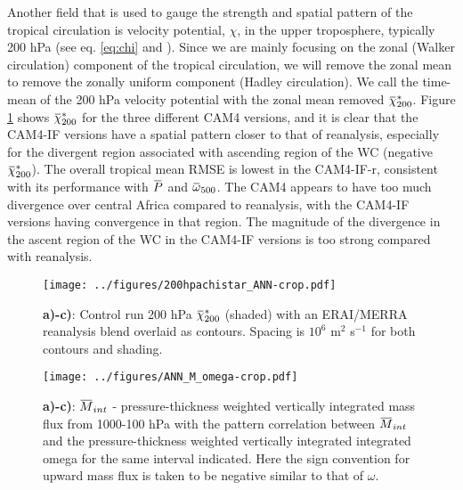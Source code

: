 \documentclass[letterpaper,12pt,titlepage,oneside,final]{book}
\newcommand{\overbar}[1]{\mkern 1.5mu\overline{\mkern-1.5mu#1\mkern-1.5mu}\mkern 1.5mu}
\begin{document}
Another field that is used to gauge the strength and spatial pattern of the tropical circulation is velocity potential, $\chi$, in the upper troposphere, typically 200 hPa (see eq. \ref{eq:chi} and \cite{tanaka_trend_2004}). Since we are mainly focusing on the zonal (Walker circulation) component of the tropical circulation, we will remove the zonal mean to remove the zonally uniform component (Hadley circulation). We call the time-mean of the 200 hPa velocity potential with the zonal mean removed $\overbar{\chi}^{*}_{200}$. Figure \ref{fig:chistar} shows $\overbar{\chi}^{*}_{200}$ for the three different CAM4 versions, and it is clear that the CAM4-IF versions have a spatial pattern closer to that of reanalysis, especially for the divergent region associated with ascending region of the WC (negative $\overbar{\chi}^{*}_{200}$). The overall tropical mean RMSE is lowest in the CAM4-IF-r, consistent with its performance with $\overbar{P}$ and $\overbar{\omega}_{500}$. The CAM4 appears to have too much divergence over central Africa compared to reanalysis, with the CAM4-IF versions having convergence in that region. The magnitude of the divergence in the ascent region of the WC in the CAM4-IF versions is too strong compared with reanalysis.
\begin{figure}[H]
\centering
\noindent\texttt{[image: ../figures/200hpachistar\_ANN-crop.pdf]}\hfill
\caption{\textbf{a)-c)}: Control run 200 hPa $\overbar{\chi}^{*}_{200}$ (shaded) with an ERAI/MERRA reanalysis blend overlaid as contours. Spacing is $10^{6}$ m$^{2}$ s$^{-1}$ for both contours and shading.}
\label{fig:chistar}
\end{figure}
\begin{figure}[H]
\centering
\noindent\texttt{[image: ../figures/ANN\_M\_omega-crop.pdf]}\hfill
\caption{\textbf{a)-c)}: $\overbar{M}_{int}$ - pressure-thickness weighted vertically integrated mass flux from 1000-100 hPa with the pattern correlation between $\overbar{M}_{int}$ and the pressure-thickness weighted vertically integrated integrated omega for the same interval indicated. Here the sign convention for upward mass flux is taken to be negative similar to that of $\omega$.}
\label{fig:mcomeg}
\end{figure}
\end{document}
